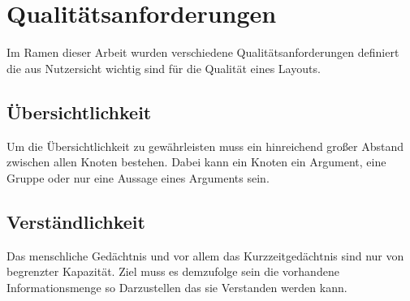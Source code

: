 \section{Qualitätsanforderungen}
Im Ramen dieser Arbeit wurden verschiedene Qualitätsanforderungen definiert die aus Nutzersicht wichtig sind für die Qualität eines Layouts.

\subsection{Übersichtlichkeit}
Um die Übersichtlichkeit zu gewährleisten muss ein hinreichend großer Abstand zwischen allen Knoten bestehen. Dabei kann ein Knoten ein Argument, eine Gruppe oder nur eine Aussage eines Arguments sein.

\subsection{Verständlichkeit}
Das menschliche Gedächtnis und vor allem das Kurzzeitgedächtnis sind nur von begrenzter Kapazität. \cite{miller1956magical, BBS:84441} Ziel muss es demzufolge sein die vorhandene Informationsmenge so Darzustellen das sie Verstanden werden kann.



%
%
%
%
%

